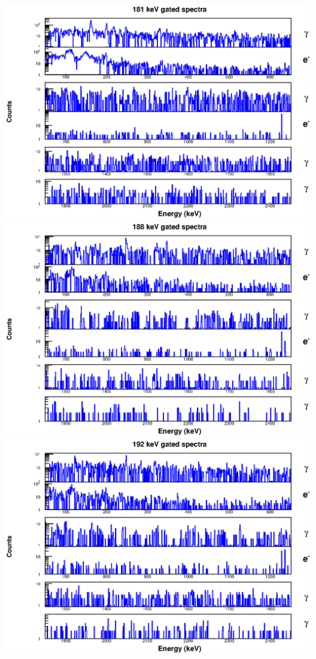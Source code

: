 \includegraphics[scale=0.8]{154Gd_Appendix/181_combined.eps}
\includegraphics[scale=0.8]{154Gd_Appendix/188_combined.eps}
\includegraphics[scale=0.8]{154Gd_Appendix/192_combined.eps}
